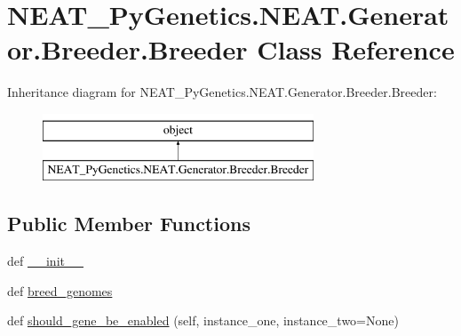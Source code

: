 \hypertarget{classNEAT__PyGenetics_1_1NEAT_1_1Generator_1_1Breeder_1_1Breeder}{}\section{N\+E\+A\+T\+\_\+\+Py\+Genetics.\+N\+E\+A\+T.\+Generator.\+Breeder.\+Breeder Class Reference}
\label{classNEAT__PyGenetics_1_1NEAT_1_1Generator_1_1Breeder_1_1Breeder}
Inheritance diagram for N\+E\+A\+T\+\_\+\+Py\+Genetics.\+N\+E\+A\+T.\+Generator.\+Breeder.\+Breeder\+:\begin{figure}[H]
\begin{center}
\leavevmode
\includegraphics[height=2.000000cm]{classNEAT__PyGenetics_1_1NEAT_1_1Generator_1_1Breeder_1_1Breeder}
\end{center}
\end{figure}
\subsection*{Public Member Functions}
\begin{DoxyCompactItemize}
\item 
def \hyperlink{classNEAT__PyGenetics_1_1NEAT_1_1Generator_1_1Breeder_1_1Breeder_a99ffddd6afb3f995598605e165772515}{\+\_\+\+\_\+init\+\_\+\+\_\+}
\item 
def \hyperlink{classNEAT__PyGenetics_1_1NEAT_1_1Generator_1_1Breeder_1_1Breeder_a6e78ccec465831c858910b1319e75076}{breed\+\_\+genomes}
\item 
def \hyperlink{classNEAT__PyGenetics_1_1NEAT_1_1Generator_1_1Breeder_1_1Breeder_a761995541d6d9ff88e2ee112a57dff0f}{should\+\_\+gene\+\_\+be\+\_\+enabled} (self, instance\+\_\+one, instance\+\_\+two=None)
\end{DoxyCompactItemize}
